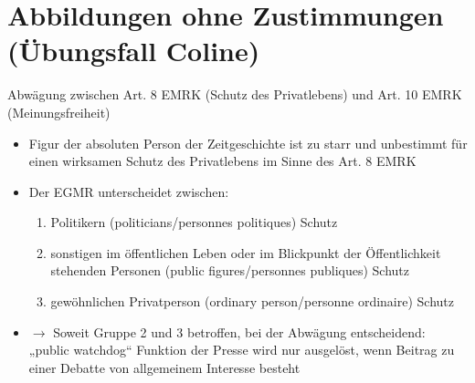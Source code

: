 \section{Abbildungen ohne Zustimmungen (Übungsfall Coline)}
Abwägung zwischen Art. 8 EMRK (Schutz des Privatlebens) und Art. 10 EMRK (Meinungsfreiheit)
\begin{itemize}
    \item Figur der absoluten Person der Zeitgeschichte ist zu starr und unbestimmt für einen wirksamen Schutz des Privatlebens im Sinne des Art. 8 EMRK
    \item Der EGMR unterscheidet zwischen:
    \begin{enumerate}
        \item Politikern (politicians/personnes politiques) Schutz
        \item sonstigen im öffentlichen Leben oder im Blickpunkt der Öffentlichkeit stehenden Personen (public figures/personnes publiques) Schutz
        \item gewöhnlichen Privatperson (ordinary person/personne ordinaire) Schutz
    \end{enumerate}
    \item $\rightarrow$ Soweit Gruppe 2 und 3 betroffen, bei der Abwägung entscheidend:\\„public watchdog“ Funktion der Presse wird nur ausgelöst, wenn Beitrag zu einer Debatte von allgemeinem Interesse besteht
\end{itemize}
